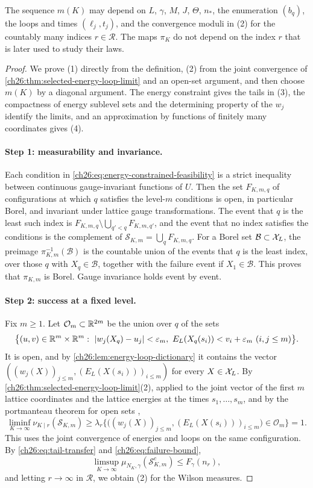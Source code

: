 The sequence $m(K)$ may depend on $L$, $\gamma$, $M$, $J$, $\Theta$, $n_*$, the enumeration $(b_q)$, the loops and times $(\ell_j,t_j)$, and the convergence moduli in (2) for the countably many indices $r\in\mathcal R$. The maps $\pi_K$ do not depend on the index $r$ that is later used to study their laws.

\begin{proof}
We prove (1) directly from the definition, (2) from the joint convergence of \cref{ch26:thm:selected-energy-loop-limit} and an open-set argument, and then choose $m(K)$ by a diagonal argument. The energy constraint gives the tails in (3), the compactness of energy sublevel sets and the determining property of the $w_j$ identify the limits, and an approximation by functions of finitely many coordinates gives (4).

\paragraph{Step 1: measurability and invariance.}
Each condition in \eqref{ch26:eq:energy-constrained-feasibility} is a strict inequality between continuous gauge-invariant functions of $U$. Then the set $F_{K,m,q}$ of configurations at which $q$ satisfies the level-$m$ conditions is open, in particular Borel, and invariant under lattice gauge transformations. The event that $q$ is the least such index is $F_{K,m,q}\setminus\bigcup_{q'<q}F_{K,m,q'}$, and the event that no index satisfies the conditions is the complement of $\mathcal S_{K,m}=\bigcup_qF_{K,m,q}$. For a Borel set $\mathcal B\subset\mathcal X_L$, the preimage $\pi_{K,m}^{-1}(\mathcal B)$ is the countable union of the events that $q$ is the least index, over those $q$ with $X_q\in\mathcal B$, together with the failure event if $X_1\in\mathcal B$. This proves that $\pi_{K,m}$ is Borel. Gauge invariance holds event by event.

\paragraph{Step 2: success at a fixed level.}
Fix $m\ge1$. Let $\mathcal O_m\subset\mathbb R^{2m}$ be the union over $q$ of the sets
\[
 \bigl\{(u,v)\in\R^m\times\R^m:\ \abs{w_j(X_q)-u_j}<\varepsilon_m,\ E_L(X_q(s_i))<v_i+\varepsilon_m\ (i,j\le m)\bigr\}.
\]
It is open, and by \cref{ch26:lem:energy-loop-dictionary} it contains the vector $((w_j(X))_{j\le m},(E_L(X(s_i)))_{i\le m})$ for every $X\in\mathcal X_L$. By \cref{ch26:thm:selected-energy-loop-limit}(2), applied to the joint vector of the first $m$ lattice coordinates and the lattice energies at the times $s_1,\dots,s_m$, and by the portmanteau theorem for open sets \cite[Theorem 2.1]{Billingsley1999},
\[
 \liminf_{K\to\infty}\nu_{K\mid r}(\mathcal S_{K,m})\ge\lambda_r\bigl\{\bigl((w_j(X))_{j\le m},(E_L(X(s_i)))_{i\le m}\bigr)\in\mathcal O_m\bigr\}=1 .
\]
This uses the joint convergence of energies and loops on the same configuration. By \eqref{ch26:eq:tail-transfer} and \eqref{ch26:eq:failure-bound},
\[
 \limsup_{K\to\infty}\mu_{N_K,\gamma}(\mathcal S_{K,m}^c)\le F_\gamma(n_r),
\]
and letting $r\to\infty$ in $\mathcal R$, we obtain (2) for the Wilson measures.


\end{proof}
